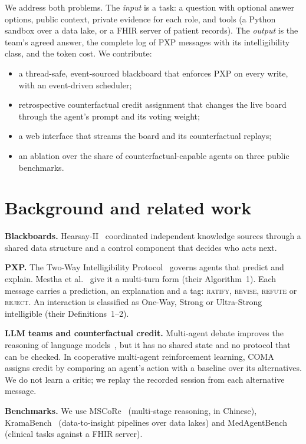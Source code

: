 \documentclass[11pt,a4paper,twocolumn]{article}
\begin{document}
We address both problems. The \emph{input} is a task: a question with optional answer options,
public context, private evidence for each role, and tools (a Python sandbox over a data lake, or
a FHIR server of patient records). The \emph{output} is the team's agreed answer, the complete
log of PXP messages with its intelligibility class, and the token cost. We contribute:
\begin{itemize}
\item a thread-safe, event-sourced blackboard that enforces PXP on every write, with an
  event-driven scheduler;
\item retrospective counterfactual credit assignment that changes the live board through the
  agent's prompt and its voting weight;
\item a web interface that streams the board and its counterfactual replays;
\item an ablation over the share of counterfactual-capable agents on three public benchmarks.
\end{itemize}

\section{Background and related work}
\textbf{Blackboards.} Hearsay-II~\cite{erman1980} coordinated independent knowledge sources
through a shared data structure and a control component that decides who acts next.

\textbf{PXP.} The Two-Way Intelligibility Protocol~\cite{baskar2023} governs agents that
predict and explain. Mestha et al.~\cite{mestha2025} give it a multi-turn form (their
Algorithm~1). Each message carries a prediction, an explanation and a tag: \textsc{ratify},
\textsc{revise}, \textsc{refute} or \textsc{reject}. An interaction is classified as One-Way,
Strong or Ultra-Strong intelligible (their Definitions~1--2).

\textbf{LLM teams and counterfactual credit.} Multi-agent debate improves the reasoning of
language models~\cite{du2024debate}, but it has no shared state and no protocol that can be
checked. In cooperative multi-agent reinforcement learning, COMA~\cite{foerster2018coma} assigns
credit by comparing an agent's action with a baseline over its alternatives. We do not learn a
critic; we replay the recorded session from each alternative message.

\textbf{Benchmarks.} We use MSCoRe~\cite{mscore} (multi-stage reasoning, in Chinese),
KramaBench~\cite{kramabench} (data-to-insight pipelines over data lakes) and
MedAgentBench~\cite{medagentbench} (clinical tasks against a FHIR server).
\end{document}
